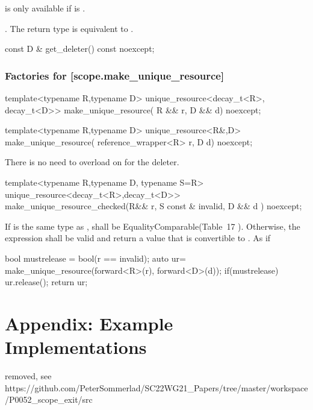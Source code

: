 \documentclass[ebook,11pt,article]{memoir}
\begin{document}
\pnum
\requires {} is only available if  is .

\pnum
\returns {}. \enternote The return type is equivalent to 
. \exitnote


\begin{itemdecl}
const D & get_deleter() const noexcept;
\end{itemdecl}

\pnum
\returns {}

\subsection {Factories for  [scope.make_unique_resource]}
\begin{itemdecl}
template<typename R,typename D>
unique_resource<decay_t<R>, decay_t<D>>
make_unique_resource( R && r, D && d) noexcept;
\end{itemdecl}

\pnum
\returns {}

\begin{itemdecl}
template<typename R,typename D>
unique_resource<R&,D>
make_unique_resource( reference_wrapper<R> r, D d) noexcept;
\end{itemdecl}

\pnum
\returns {}

\pnum \enternote There is no need to overload on  for the deleter. \exitnote



\begin{itemdecl}
template<typename R,typename D, typename S=R>
unique_resource<decay_t<R>,decay_t<D>>
make_unique_resource_checked(R&& r, S const & invalid, D && d ) noexcept;
\end{itemdecl}

\pnum
\requires If  is the same type as ,  shall be EqualityComparable(Table~17
). Otherwise, the expression  shall be valid and return a value that is convertible to . 
\pnum
\effects As if
\begin{codeblock}
  bool mustrelease = bool(r == invalid);
  auto ur= make_unique_resource(forward<R>(r), forward<D>(d));
  if(mustrelease) ur.release();
  return ur;
\end{codeblock}

\newpage
\chapter{Appendix: Example Implementations}
removed, see \\
https://github.com/PeterSommerlad/SC22WG21_Papers/tree/master/workspace/P0052_scope_exit/src
\end{document}
